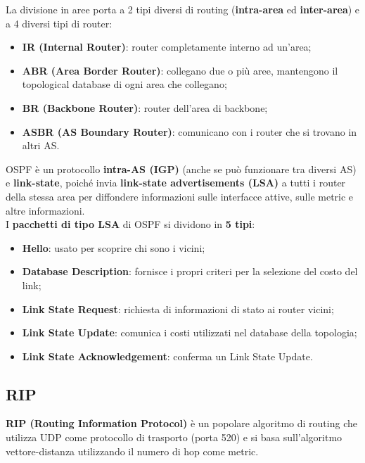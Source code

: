         La divisione in aree porta a 2 tipi diversi di routing (\textbf{intra-area} ed \textbf{inter-area}) e a 4 diversi tipi
        di router:
        
        \begin{itemize}
            \item \textbf{IR (Internal Router)}: router completamente interno ad un’area;
            \item \textbf{ABR (Area Border Router)}: collegano due o più aree, mantengono il topological
            database di ogni area che collegano;
            \item \textbf{BR (Backbone Router)}: router dell’area di backbone;
            \item \textbf{ASBR (AS Boundary Router)}: comunicano con i router che si trovano in altri AS.
        \end{itemize}
        
        OSPF è un protocollo \textbf{intra-AS (IGP)} (anche se può funzionare tra diversi AS) e \textbf{link-state},
        poiché invia \textbf{link-state advertisements (LSA)} a tutti i router della stessa area per diffondere
        informazioni sulle interfacce attive, sulle metric e altre informazioni.\\
        
        I \textbf{pacchetti di tipo LSA} di OSPF si dividono in \textbf{5 tipi}:
        
        \begin{itemize}
            \item \textbf{Hello}: usato per scoprire chi sono i vicini;
            \item \textbf{Database Description}: fornisce i propri criteri per la selezione del costo del link;
            \item \textbf{Link State Request}: richiesta di informazioni di stato ai router vicini;
            \item \textbf{Link State Update}: comunica i costi utilizzati nel database della topologia;
            \item \textbf{Link State Acknowledgement}: conferma un Link State Update.
        \end{itemize}
        
        \subsection{RIP}
        \textbf{RIP (Routing Information Protocol)} è un popolare algoritmo di routing che utilizza UDP come
        protocollo di trasporto (porta 520) e si basa sull’algoritmo vettore-distanza utilizzando il
        numero di hop come metric.\\
        
